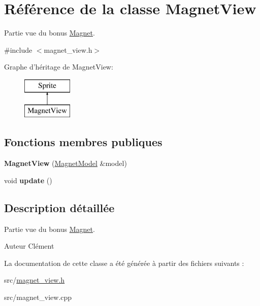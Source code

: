\hypertarget{class_magnet_view}{\section{Référence de la classe Magnet\+View}
\label{class_magnet_view}
}


Partie vue du bonus \hyperlink{class_magnet}{Magnet}.  




{\ttfamily \#include $<$magnet\+\_\+view.\+h$>$}

Graphe d'héritage de Magnet\+View\+:\begin{figure}[H]
\begin{center}
\leavevmode
\includegraphics[height=2.000000cm]{class_magnet_view}
\end{center}
\end{figure}
\subsection*{Fonctions membres publiques}
\begin{DoxyCompactItemize}
\item 
\hypertarget{class_magnet_view_a1aa5fc7f4f6918c9e81e3a27c7f5633e}{{\bfseries Magnet\+View} (\hyperlink{class_magnet_model}{Magnet\+Model} \&model)}\label{class_magnet_view_a1aa5fc7f4f6918c9e81e3a27c7f5633e}

\item 
\hypertarget{class_magnet_view_aed370987b41e1837cdfcb85cbb5c5c4c}{void {\bfseries update} ()}\label{class_magnet_view_aed370987b41e1837cdfcb85cbb5c5c4c}

\end{DoxyCompactItemize}


\subsection{Description détaillée}
Partie vue du bonus \hyperlink{class_magnet}{Magnet}. 

\begin{DoxyAuthor}{Auteur}
Clément 
\end{DoxyAuthor}


La documentation de cette classe a été générée à partir des fichiers suivants \+:\begin{DoxyCompactItemize}
\item 
src/\hyperlink{magnet__view_8h}{magnet\+\_\+view.\+h}\item 
src/magnet\+\_\+view.\+cpp\end{DoxyCompactItemize}
